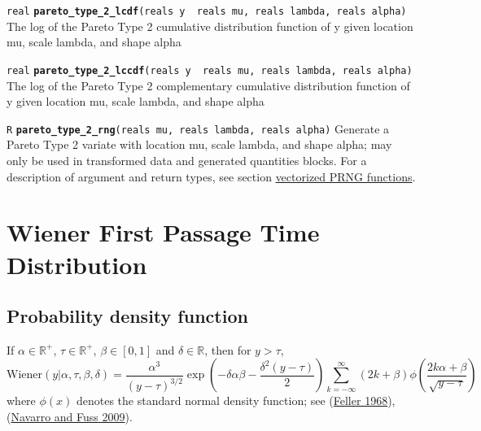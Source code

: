 \documentclass[
  10pt,
]{book}
\begin{document}
\texttt{real} \textbf{\texttt{pareto\_type\_2\_lcdf}}\texttt{(reals\ y\ \textbar{}\ reals\ mu,\ reals\ lambda,\ reals\ alpha)}\newline
The log of the Pareto Type 2 cumulative distribution function of y
given location mu, scale lambda, and shape alpha


\texttt{real} \textbf{\texttt{pareto\_type\_2\_lccdf}}\texttt{(reals\ y\ \textbar{}\ reals\ mu,\ reals\ lambda,\ reals\ alpha)}\newline
The log of the Pareto Type 2 complementary cumulative distribution
function of y given location mu, scale lambda, and shape alpha


\texttt{R} \textbf{\texttt{pareto\_type\_2\_rng}}\texttt{(reals\ mu,\ reals\ lambda,\ reals\ alpha)}\newline
Generate a Pareto Type 2 variate with location mu, scale lambda, and
shape alpha; may only be used in transformed data and generated quantities blocks.
For a description of argument and return types, see section
\protect\hyperlink{prng-vectorization}{vectorized PRNG functions}.

\hypertarget{wiener-first-passage-time-distribution}{%
\section{Wiener First Passage Time Distribution}\label{wiener-first-passage-time-distribution}}

\hypertarget{probability-density-function-20}{%
\subsection{Probability density function}\label{probability-density-function-20}}

If \(\alpha \in \mathbb{R}^+\), \(\tau \in \mathbb{R}^+\), \(\beta \in [0, 1]\) and \(\delta \in \mathbb{R}\), then for \(y > \tau\), \[
\text{Wiener}(y|\alpha, \tau, \beta, \delta) =
\frac{\alpha^3}{(y-\tau)^{3/2}} \exp \! \left(- \delta \alpha \beta -
\frac{\delta^2(y-\tau)}{2}\right) \sum_{k = - \infty}^{\infty} (2k +
\beta) \phi \! \left(\frac{2k \alpha + \beta}{\sqrt{y - \tau}}\right)
\] where \(\phi(x)\) denotes the standard normal density function; see
(\protect\hyperlink{ref-Feller1968}{Feller 1968}), (\protect\hyperlink{ref-NavarroFuss2009}{Navarro and Fuss 2009}).
\end{document}
